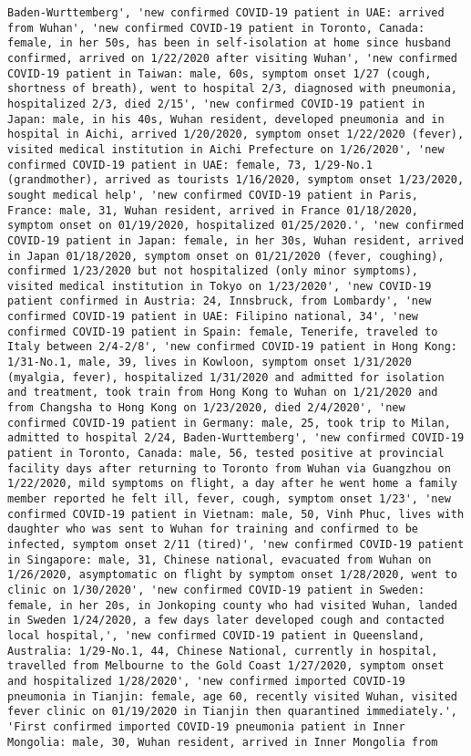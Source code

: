 \documentclass[11pt]{article}
\begin{document}
\begin{Verbatim}[commandchars=\\\{\}]
Baden-Wurttemberg', 'new confirmed COVID-19 patient in UAE: arrived from Wuhan', 'new confirmed COVID-19 patient in Toronto, Canada: female, in her 50s, has been in self-isolation at home since husband confirmed, arrived on 1/22/2020 after visiting Wuhan', 'new confirmed COVID-19 patient in Taiwan: male, 60s, symptom onset 1/27 (cough, shortness of breath), went to hospital 2/3, diagnosed with pneumonia, hospitalized 2/3, died 2/15', 'new confirmed COVID-19 patient in Japan: male, in his 40s, Wuhan resident, developed pneumonia and in hospital in Aichi, arrived 1/20/2020, symptom onset 1/22/2020 (fever), visited medical institution in Aichi Prefecture on 1/26/2020', 'new confirmed COVID-19 patient in UAE: female, 73, 1/29-No.1 (grandmother), arrived as tourists 1/16/2020, symptom onset 1/23/2020, sought medical help', 'new confirmed COVID-19 patient in Paris, France: male, 31, Wuhan resident, arrived in France 01/18/2020, symptom onset on 01/19/2020, hospitalized 01/25/2020.', 'new confirmed COVID-19 patient in Japan: female, in her 30s, Wuhan resident, arrived in Japan 01/18/2020, symptom onset on 01/21/2020 (fever, coughing), confirmed 1/23/2020 but not hospitalized (only minor symptoms), visited medical institution in Tokyo on 1/23/2020', 'new COVID-19 patient confirmed in Austria: 24, Innsbruck, from Lombardy', 'new confirmed COVID-19 patient in UAE: Filipino national, 34', 'new confirmed COVID-19 patient in Spain: female, Tenerife, traveled to Italy between 2/4-2/8', 'new confirmed COVID-19 patient in Hong Kong: 1/31-No.1, male, 39, lives in Kowloon, symptom onset 1/31/2020 (myalgia, fever), hospitalized 1/31/2020 and admitted for isolation and treatment, took train from Hong Kong to Wuhan on 1/21/2020 and from Changsha to Hong Kong on 1/23/2020, died 2/4/2020', 'new confirmed COVID-19 patient in Germany: male, 25, took trip to Milan, admitted to hospital 2/24, Baden-Wurttemberg', 'new confirmed COVID-19 patient in Toronto, Canada: male, 56, tested positive at provincial facility days after returning to Toronto from Wuhan via Guangzhou on 1/22/2020, mild symptoms on flight, a day after he went home a family member reported he felt ill, fever, cough, symptom onset 1/23', 'new confirmed COVID-19 patient in Vietnam: male, 50, Vinh Phuc, lives with daughter who was sent to Wuhan for training and confirmed to be infected, symptom onset 2/11 (tired)', 'new confirmed COVID-19 patient in Singapore: male, 31, Chinese national, evacuated from Wuhan on 1/26/2020, asymptomatic on flight by symptom onset 1/28/2020, went to clinic on 1/30/2020', 'new confirmed COVID-19 patient in Sweden: female, in her 20s, in Jonkoping county who had visited Wuhan, landed in Sweden 1/24/2020, a few days later developed cough and contacted local hospital,', 'new confirmed COVID-19 patient in Queensland, Australia: 1/29-No.1, 44, Chinese National, currently in hospital, travelled from Melbourne to the Gold Coast 1/27/2020, symptom onset and hospitalized 1/28/2020', 'new confirmed imported COVID-19 pneumonia in Tianjin: female, age 60, recently visited Wuhan, visited fever clinic on 01/19/2020 in Tianjin then quarantined immediately.', 'First confirmed imported COVID-19 pneumonia patient in Inner Mongolia: male, 30, Wuhan resident, arrived in Inner Mongolia from 
\end{Verbatim}
\end{document}
